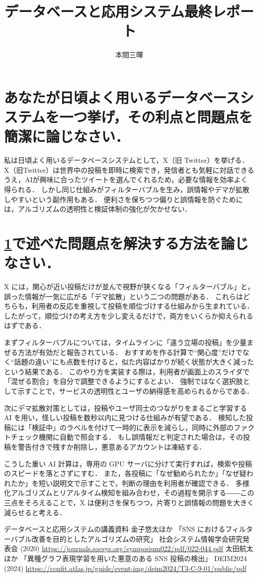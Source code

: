 \documentclass[titlepage,a4paper]{jsarticle}
\title{データベースと応用システム最終レポート}
\author{本間三暉}
\begin{document}
\section{あなたが日頃よく用いるデータベースシステムを一つ挙げ，その利点と問題点を簡潔に論じなさい．}\label{kadai1}
私は日頃よく用いるデータベースシステムとして，X（旧 Twitter）を挙げる．
X（旧Twitter）は世界中の投稿を即時に検索でき，発信者とも気軽に対話できるうえ，AIが興味に合ったツイートを選んでくれるため，必要な情報を効率よく得られる．
しかし同じ仕組みがフィルターバブルを生み，誤情報やデマが拡散しやすいという副作用もある．
便利さを保ちつつ偏りと誤情報を防ぐためには，アルゴリズムの透明性と検証体制の強化が欠かせない．

\section{\ref{kadai1}で述べた問題点を解決する方法を論じなさい．}
X には，関心が近い投稿だけが並んで視野が狭くなる「フィルターバブル」と，誤った情報が一気に広がる「デマ拡散」という二つの問題がある．
これらはどちらも，利用者の反応を重視して投稿を順位づけする仕組みから生まれている．
したがって，順位づけの考え方を少し変えるだけで，両方をいくらか抑えられるはずである．

まずフィルターバブルについては，タイムラインに「違う立場の投稿」を少量まぜる方法が有効だと報告されている\cite{filter-algo}．
おすすめを作る計算で“関心度”だけでなく“話題の違い”にも点数を付けると，似た内容ばかりが続く状態が大きく減ったという結果である．
このやり方を実装する際は，利用者が画面上のスライダで「混ぜる割合」を自分で調整できるようにするとよい．
強制ではなく選択肢として示すことで，サービスの透明性とユーザの納得感を高められるからである．

次にデマ拡散対策としては，投稿やユーザ同士のつながりをまるごと学習する AI を用い，怪しい投稿を数秒以内に見つける仕組みが有望である\cite{gnn-deim2024}．
検知した投稿には「検証中」のラベルを付けて一時的に表示を減らし，同時に外部のファクトチェック機関に自動で照会する．
もし誤情報だと判定された場合は，その投稿を警告付きで残すか削除し，悪意あるアカウントは凍結する．

こうした重い AI 計算は，専用の GPU サーバに分けて実行すれば，検索や投稿のスピードを落とさずにすむ．
また，各投稿に「なぜ勧められたか」「なぜ疑われたか」を短い説明文で示すことで，判断の理由を利用者が確認できる．
多様化アルゴリズムとリアルタイム検知を組み合わせ，その過程を開示する――この三点をそろえることで，X は便利さを保ちつつ，片寄りと誤情報の問題を大きく減らせると考える．

\begin{thebibliography}{99}
 データベースと応用システムの講義資料
 金子悠太ほか 「SNS におけるフィルターバブル改善を目的としたアルゴリズムの研究」 社会システム情報学会研究発表会 (2020) \url{https://journals.socsys.org/symposium022/pdf/022-044.pdf}
 太田航太ほか 「異種グラフ表現学習を用いた悪意のある SNS 投稿の検出」 DEIM2024 (2024) \url{https://confit.atlas.jp/guide/event-img/deim2024/T3-C-9-01/public/pdf}
\end{thebibliography}
\end{document}
